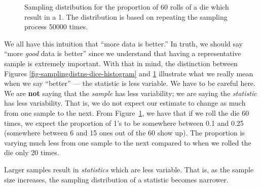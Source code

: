 \documentclass[
  letterpaper,
  DIV=11,
  numbers=noendperiod]{scrreprt}
\theoremstyle{plain}
\theoremstyle{definition}
\theoremstyle{definition}
\theoremstyle{remark}
\begin{document}
\begin{figure}


\caption{\label{fig-samplingdistns-dice-histogram2}Sampling distribution
for the proportion of 60 rolls of a die which result in a 1. The
distribution is based on repeating the sampling process 50000 times.}

\end{figure}%

We all have this intuition that ``more data is better.'' In truth, we
should say ``more \emph{good} data is better'' since we understand that
having a representative sample is extremely important. With that in
mind, the distinction between Figures
\ref{fig-samplingdistns-dice-histogram} and
\ref{fig-samplingdistns-dice-histogram2} illustrate what we really mean
when we say ``better'' --- the statistic is less variable. We have to be
careful here. We are \textbf{not} saying that the \emph{sample} has less
variability; we are saying the \emph{statistic} has less variability.
That is, we do not expect our estimate to change as much from one sample
to the next. From Figure~\ref{fig-samplingdistns-dice-histogram2}, we
have that if we roll the die 60 times, we expect the proportion of 1's
to be somewhere between 0.1 and 0.25 (somewhere between 6 and 15 ones
out of the 60 show up). The proportion is varying much less from one
sample to the next compared to when we rolled the die only 20 times.

\begin{tcolorbox}[enhanced jigsaw, breakable, titlerule=0mm, colframe=quarto-callout-tip-color-frame, bottomtitle=1mm, opacityback=0, rightrule=.15mm, toptitle=1mm, arc=.35mm, bottomrule=.15mm, left=2mm, title=\textcolor{quarto-callout-tip-color}{\faLightbulb}\hspace{0.5em}{Big Idea}, leftrule=.75mm, coltitle=black, toprule=.15mm, colbacktitle=quarto-callout-tip-color!10!white, colback=white, opacitybacktitle=0.6]

Larger samples result in \emph{statistics} which are less variable. That
is, as the sample size increases, the sampling distribution of a
statistic becomes narrower.

\end{tcolorbox}
\end{document}
